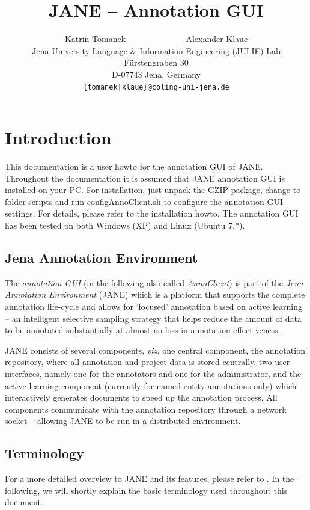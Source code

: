 \documentclass[DIV12,english,11pt,halfparskip]{scrartcl}
\title{JANE -- Annotation GUI}
\author{\normalsize Katrin Tomanek ~~~~~~~~~~~~~ Alexander Klaue\\
  \normalsize  Jena University Language \& Information Engineering (JULIE) Lab\\
  \normalsize F\"urstengraben 30 \\
  \normalsize D-07743 Jena, Germany\\
  {\normalsize \tt \{tomanek|klaue\}@coling-uni-jena.de} } \date{}
\begin{document}
\maketitle
\newpage
\tableofcontents
\newpage

\section{Introduction}


This documentation is a user howto for the annotation GUI of JANE.
Throughout the documentation it is assumed that JANE annotation GUI is
installed on your PC. For installation, just unpack the GZIP-package,
change to folder \url{scripts} and run \url{configAnnoClient.sh} to
configure the annotation GUI settings. For details, please refer to
the installation howto. The annotation GUI has been tested on both
Windows (XP) and Linux (Ubuntu 7.*).


\subsection{Jena Annotation Environment}

The \emph{annotation GUI} (in the following also called
\emph{AnnoClient}) is part of the \emph{Jena Annotation Environment}
(JANE) which is a platform that supports the complete annotation
life-cycle and allows for `focused' annotation based on active
learning -- an intelligent selective sampling strategy that helps
reduce the amount of data to be annotated substantially at almost no
loss in annotation effectiveness.

JANE consists of several components, \textit{viz.} one central
component, the annotation repository, where all annotation and project
data is stored centrally, two user interfaces, namely one for the
annotators and one for the administrator, and the active learning
component (currently for named entity annotations only) which
interactively generates documents to speed up the annotation process.
All components communicate with the annotation repository through a
network socket -- allowing JANE to be run in a distributed
environment.


\subsection{Terminology}
\label{ss:terminology}
For a more detailed overview to JANE and its features, please refer to
\cite{Tomanek2007law}. In the following, we will shortly explain the
basic terminology used throughout this document.
\end{document}
